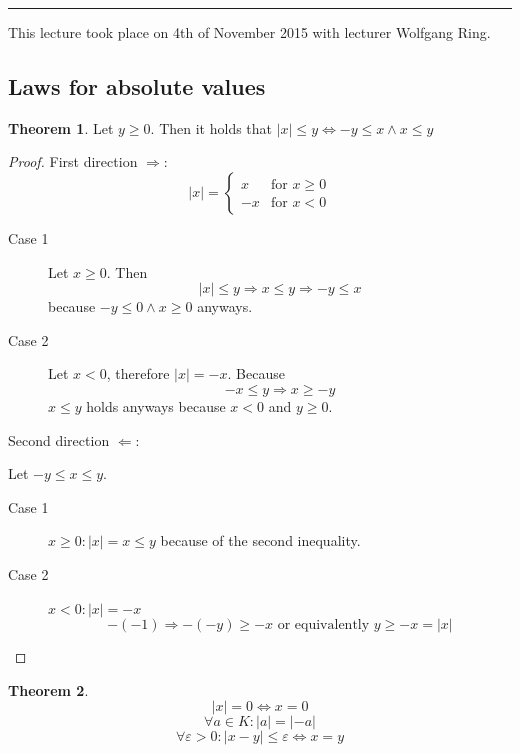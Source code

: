 \documentclass[a4paper,landscape,twocolumn]{article}
\theoremstyle{definition}
\newtheorem{theorem}{Theorem}
\newcommand\abs[1]{\left|#1\right|}
\newcommand\meta[3]{\hrule{} This #1 took place on #2 with lecturer #3.\par}
\begin{document}
\meta{lecture}{4th of November 2015}{Wolfgang Ring}

\subsection{Laws for absolute values}
%
\begin{theorem}
  Let $y \geq 0$. Then it holds that $\abs{x} \leq y \Leftrightarrow -y \leq x \land x \leq y$
\end{theorem}
\begin{proof}
  First direction $\Rightarrow$:
  \[
    \abs{x} = \begin{cases}
      x & \text{for } x \geq 0\\
      -x & \text{for } x < 0
    \end{cases}
  \]
  \begin{description}
    \item[Case 1] Let $x \geq 0$. Then
      \[ \abs{x} \leq y \Rightarrow x \leq y \Rightarrow -y \leq x \]
      because $-y \leq 0 \land x \geq 0$ anyways.
    \item[Case 2] Let $x < 0$, therefore $\abs{x} = -x$. Because
      \[ -x \leq y \Rightarrow x \geq -y \]
      $x \leq y$ holds anyways because $x < 0$ and $y \geq 0$.
  \end{description}

  Second direction $\Leftarrow$:

  Let $-y \leq x \leq y$.
  \begin{description}
    \item[Case 1] $x \geq 0: \abs{x} = x \leq y$ because of the second inequality.
    \item[Case 2] $x < 0: \abs{x} = -x$
      \[ -(-1) \Rightarrow -(-y) \geq -x \text{ or equivalently } y \geq -x = \abs{x} \]
  \end{description}
\end{proof}

\begin{theorem}
  \[ \abs{x} = 0 \Leftrightarrow x = 0 \]
  \[ \forall a \in K: \abs{a} = \abs{-a} \]
  \[ \forall \varepsilon > 0: \abs{x - y} \leq \varepsilon \Leftrightarrow x = y \]
\end{theorem}
\end{document}
